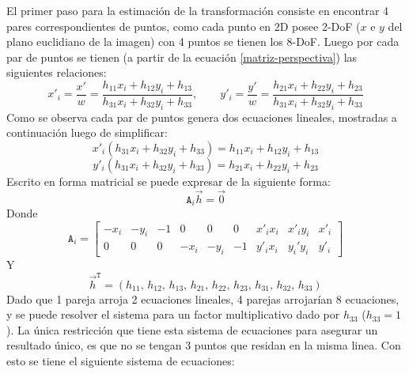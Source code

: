 El primer paso para la estimación de la transformación consiste en encontrar 4 pares correspondientes de puntos, como cada punto en 2D posee 2-DoF ($x$ e $y$ del plano euclidiano de la imagen) con 4 puntos se tienen los 8-DoF. Luego por cada par de puntos se tienen (a partir de la ecuación \ref{matriz-perspectiva}) las siguientes relaciones: 
\begin{displaymath}
x'_i = \frac{x'}{w} = \frac{h_{11}x_i+h_{12}y_i+h_{13}}{h_{31}x_i+h_{32}y_i+h_{33}}, \qquad y'_i = \frac{y'}{w} = \frac{h_{21}x_i+h_{22}y_i+h_{23}}{h_{31}x_i+h_{32}y_i+h_{33}}
\end{displaymath}
Como se observa cada par de puntos genera dos ecuaciones lineales, mostradas a continuación luego de simplificar:
\begin{displaymath}
{x'_i ( h_{31}x_i+h_{32}y_i+h_{33} ) = h_{11}x_i+h_{12}y_i+h_{13}}
\end{displaymath}
\begin{displaymath}
{y'_i ( h_{31}x_i+h_{32}y_i+h_{33} ) = h_{21}x_i+h_{22}y_i+h_{23}}
\end{displaymath}
Escrito en forma matricial se puede expresar de la siguiente forma:
\begin{displaymath}
\mathtt{A}_i\vec{h}=\vec{0}
\end{displaymath}
Donde 
\begin{displaymath}
\mathtt{A}_i =
\begin{bmatrix}
-x_i&-y_i&-1&0&0&0&x'_ix_i&x'_iy_i&x'_i\\
0&0&0&-x_i&-y_i&-1&y'_ix_i&y_i'y_i&y'_i
\end{bmatrix}
\end{displaymath}
Y
\begin{displaymath}
\vec{h}^\mathtt{T} = (h_{11},\, h_{12},\, h_{13},\, h_{21},\, h_{22},\, h_{23},\, h_{31},\, h_{32},\, h_{33})
\end{displaymath}
Dado que 1 pareja arroja 2 ecuaciones lineales, 4 parejas arrojarían 8 ecuaciones, y se puede resolver el sistema para un factor multiplicativo dado por $h_{33}$ ($h_{33}=1$). La única restricción que tiene esta sistema de ecuaciones para asegurar un resultado único, es que no se tengan 3 puntos que residan en la misma linea. Con esto se tiene el siguiente sistema de ecuaciones:
